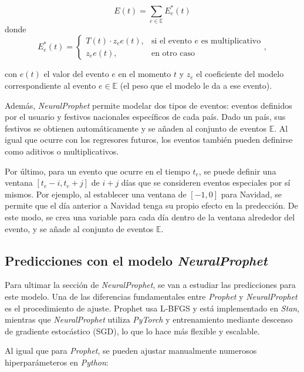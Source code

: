 \documentclass[12pt,twoside]{article}
\begin{document}
\begin{equation}
E(t) = \sum_{e \in \mathbb{E}} E_e^*(t)
\end{equation}
 donde 
\begin{equation}
E_e^*(t) =
\begin{cases}
T(t) \cdot z_ee(t), & \text{si el evento } e \text{ es multiplicativo} \\
z_ee(t), & \text{en otro caso}
\end{cases},
\end{equation}

con $e(t)$ el valor del evento $e$ en el momento $t$ y $z_e$ el coeficiente del modelo correspondiente al evento $e\in \mathbb{E}$ (el peso que el modelo le da a ese evento).

Además, \textit{NeuralProphet} permite modelar dos tipos de eventos: eventos definidos por el usuario y festivos nacionales específicos de cada país. Dado un país, sus festivos se obtienen automáticamente y se añaden al conjunto de eventos $\mathbb{E}$. Al igual que ocurre con los regresores futuros, los eventos también pueden definirse como aditivos o multiplicativos.

Por último, para un evento que ocurre en el tiempo $t_e$, se puede definir una ventana $[t_e-i,t_e+j]$ de $i+j$ días que se consideren eventos especiales por sí mismos. Por ejemplo, al establecer una ventana de $[-1,0]$ para Navidad, se permite que el día anterior a Navidad tenga su propio efecto en la predección. De este modo, se crea una variable para cada día dentro de la ventana alrededor del evento, y se añade al conjunto de eventos $\mathbb{E}$. 


\subsection{Predicciones con el modelo \textit{NeuralProphet}}\label{sec:31}

Para ultimar la sección de \textit{NeuralProphet}, se van a estudiar las predicciones para este modelo. Una de las diferencias fundamentales entre \textit{Prophet} y \textit{NeuralProphet} es el procedimiento de ajuste. Prophet usa L-BFGS y está implementado en \textit{Stan}, mientras que \textit{NeuralProphet} utiliza \textit{PyTorch} y entrenamiento mediante descenso de gradiente estocástico (SGD), lo que lo hace más flexible y escalable.

Al igual que para \textit{Prophet}, se pueden ajustar manualmente numerosos hiperparámeteros \cite{np2} en \textit{Python}:
\end{document}
